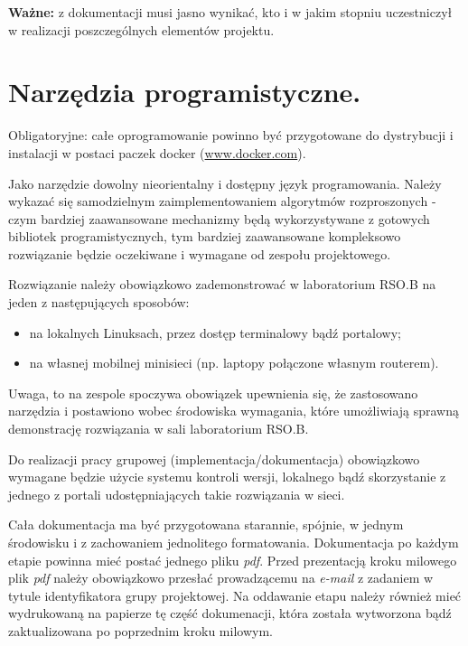\documentclass[a4paper,11pt]{article}
\begin{document}
  \textbf{Ważne:} z dokumentacji musi jasno wynikać, kto i w jakim stopniu uczestniczył w realizacji poszczególnych elementów projektu. 
  
\section{Narzędzia programistyczne.}
  Obligatoryjne: całe oprogramowanie powinno być przygotowane do dystrybucji i instalacji w postaci paczek docker (\url{www.docker.com}). 
  
  Jako narzędzie dowolny nieorientalny i dostępny język programowania.
  Należy wykazać się samodzielnym zaimplementowaniem algorytmów rozproszonych - czym bardziej zaawansowane mechanizmy będą wykorzystywane z gotowych bibliotek programistycznych,
  tym bardziej zaawansowane kompleksowo rozwiązanie będzie oczekiwane i wymagane od zespołu projektowego.
  
  Rozwiązanie należy obowiązkowo zademonstrować w laboratorium \linebreak RSO.B na jeden z następujących sposobów:
  \begin{itemize}
    \item na lokalnych Linuksach, przez dostęp terminalowy bądź portalowy;
    \item na własnej mobilnej minisieci (np. laptopy połączone własnym routerem).
  \end{itemize}
  
  Uwaga, to na zespole spoczywa obowiązek upewnienia się, że zastosowano narzędzia i postawiono wobec środowiska wymagania,
  które umożliwiają sprawną demonstrację rozwiązania w sali laboratorium RSO.B.
  
  Do realizacji pracy grupowej (implementacja/dokumentacja) obowiązkowo wymagane będzie użycie systemu kontroli wersji, lokalnego bądź skorzystanie z jednego z portali
  udostępniających takie rozwiązania w sieci.
  
  Cała dokumentacja ma być przygotowana starannie, spójnie, w jednym środowisku i z zachowaniem jednolitego formatowania.
  Dokumentacja po każdym etapie powinna mieć postać jednego pliku \textit{pdf}.
  Przed prezentacją kroku milowego plik \textit{pdf} należy obowiązkowo przesłać prowadzącemu na \linebreak \textit{e-mail} z zadaniem w tytule identyfikatora grupy projektowej.
  Na oddawanie etapu należy również mieć wydrukowaną na papierze tę część dokumenacji, która została wytworzona bądź zaktualizowana po poprzednim kroku milowym.
  
\end{document}
